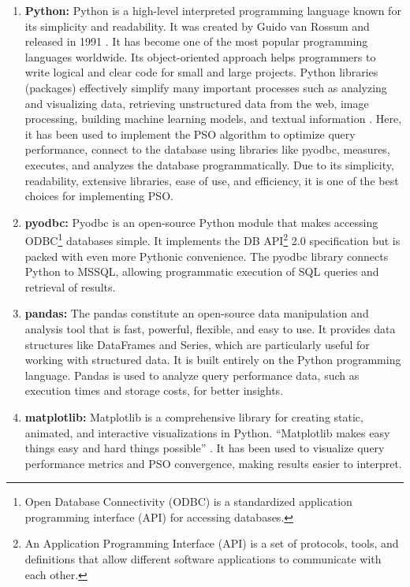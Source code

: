 \begin{enumerate}[label=(\roman*)]
\item\textbf{Python:} Python is a high-level interpreted programming language known for its simplicity and readability. It was created by Guido van Rossum and released in 1991 \cite{martin2023stam,wijanarko2020prediksi} . It has become one of the most popular programming languages worldwide. Its object-oriented approach helps programmers to write logical and clear code for small and large projects. Python libraries (packages) effectively simplify many important processes such as analyzing and visualizing data, retrieving unstructured data from the web, image processing, building machine learning models, and textual information \cite{Samira_Gholizadeh2022}. Here, it has been used to implement the PSO algorithm to optimize query performance, connect to the database using libraries like pyodbc, measures, executes, and analyzes the database programmatically. Due to its simplicity, readability, extensive libraries, ease of use, and efficiency, it is one of the best choices for implementing PSO.

\item\textbf{pyodbc:} Pyodbc is an open-source Python module that makes accessing ODBC\footnote{Open Database Connectivity (ODBC) is a standardized application programming interface (API) for accessing databases.} databases simple. It implements the DB API\footnote{An Application Programming Interface (API) is a set of protocols, tools, and definitions that allow different software applications to communicate with each other.} 2.0 specification but is packed with even more Pythonic convenience. The pyodbc library connects Python to MSSQL, allowing programmatic execution of SQL queries and retrieval of results.

\item\textbf{pandas:} The pandas constitute an open-source data manipulation and analysis tool that is fast, powerful, flexible, and easy to use. It provides data structures like DataFrames and Series, which are particularly useful for working with structured data. It is built entirely on the Python programming language. Pandas is used to analyze query performance data, such as execution times and storage costs, for better insights.

\item\textbf{matplotlib:} Matplotlib is a comprehensive library for creating static, animated, and interactive visualizations in Python. \enquote{Matplotlib makes easy things easy and hard things possible} \cite{matplotlib}. It has been used to visualize query performance metrics and PSO convergence, making results easier to interpret.


\end{enumerate}
